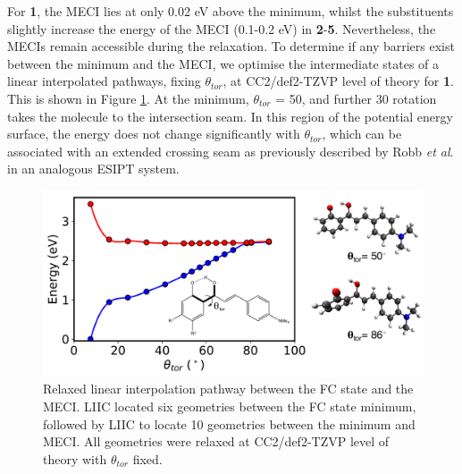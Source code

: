 For \textbf{1}, the MECI lies at only 0.02 eV above the \Kstar{} minimum, whilst the substituents slightly increase the energy of the MECI (0.1-0.2 eV) in \textbf{2}-\textbf{5}. Nevertheless, the MECIs remain accessible during the relaxation. To determine if any barriers exist between the \Kstar{} minimum and the MECI, we optimise the intermediate states of a linear interpolated pathways, fixing $\theta_{tor}$, at CC2/def2-TZVP level of theory for \textbf{1}. This is shown in Figure \ref{figure: H_CC2_LIIC_Scan}. At the \Kstar{} minimum, $\theta_{tor}$ = 50\textdegree, and further 30\textdegree{} rotation takes the molecule to the intersection seam. In this region of the potential energy surface, the \sone{} energy does not change significantly with $\theta_{tor}$, which can be associated with an extended crossing seam as previously described by Robb \textit{et al}. in an analogous ESIPT system.\cite{Paterson2005}

\begin{figure}[t]
\centering
  \includegraphics[width=0.9\linewidth]{3nonradiativedecay/H_CC2_LIIC_Scan.pdf}
  \caption[Potential energy surface along the relaxation mode $\theta_{tor}$]{Relaxed linear interpolation pathway between the FC state and the MECI. LIIC located six geometries between the FC state  \Kstar{} minimum, followed by LIIC to locate 10 geometries between the \Kstar{} minimum and MECI. All geometries were relaxed at CC2/def2-TZVP level of theory with $\theta_{tor}$ fixed.}
  \label{figure: H_CC2_LIIC_Scan}
\end{figure}

